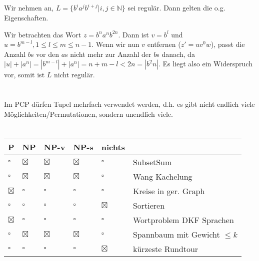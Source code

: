 \documentclass{article}
\begin{document}
\subsection{}%
Wir nehmen an, $L = \{b^ia^jb^{i+j} | i,j\in \mathbb{N}\}$ sei regulär. Dann gelten die o.g. Eigenschaften.

Wir betrachten das Wort $z = b^na^nb^{2n}$. Dann ist $v = b^l$ und $u = b^{m-l}, 1 \leq l \leq m \leq n-1$. Wenn wir nun $v$ entfernen ($z' = uv^0w$), passt die Anzahl $b$s vor den $a$s nicht mehr zur Anzahl der $b$s danach, da $|u|+|a^n| = |b^{m-l}|+|a^n| = n+m-l < 2n = |b^2n|$. Es liegt also ein Widerspruch vor, somit ist $L$ nicht regulär.

\section{}%
Im PCP dürfen Tupel mehrfach verwendet werden, d.h. es gibt nicht endlich viele Möglichkeiten/Permutationen, sondern unendlich viele.

\section{}%
\begin{center}
\begin{tabularx}{\textwidth}{lllll|X}
P & NP & NP-v & NP-s & nichts & \\
\hline
$\square$ & $\boxtimes$ & $\boxtimes$ & $\boxtimes$ & $\square$ & SubsetSum \\
$\square$ & $\boxtimes$ & $\boxtimes$ & $\boxtimes$ & $\square$ & Wang Kachelung \\
$\boxtimes$ & $\square$ & $\square$ & $\square$ & $\square$ & Kreise in ger. Graph \\
$\square$ & $\square$ & $\square$ & $\square$ & $\boxtimes$ & Sortieren \\
$\boxtimes$ & $\square$ & $\square$ & $\square$ & $\square$ & Wortproblem DKF Sprachen \\
$\square$ & $\boxtimes$ & $\boxtimes$ & $\boxtimes$ & $\square$ & Spannbaum mit Gewicht $\leq k$ \\
$\square$ & $\square$ & $\square$ & $\square$ & $\boxtimes$ & kürzeste Rundtour \\
\end{tabularx}
\end{center}

\section{}%
\end{document}
